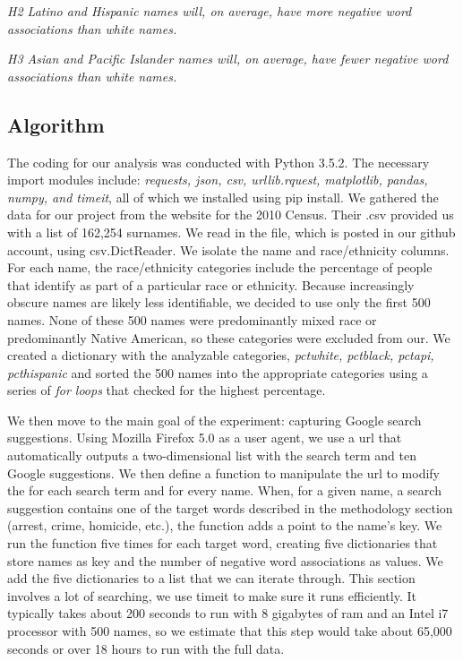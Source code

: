 \documentclass[sigconf]{acmart}
\begin{document}
{\em H2 Latino and Hispanic names will, on average, have more negative word associations than white names.} \\

\vspace{2mm}

{\em H3 Asian and Pacific Islander names will, on average, have fewer negative word associations than white names.}
\vspace{2mm}

\subsection{Algorithm}

The coding for our analysis was conducted with Python 3.5.2. The necessary import modules include: {\em requests, json, csv, urllib.rquest, matplotlib, pandas, numpy, and timeit}, all of which we installed using pip install. We gathered the data for our project from the website for the 2010 Census. Their .csv provided us with a list of 162,254 surnames. We read in the file, which is posted in our github account, using csv.DictReader. We isolate the name and race/ethnicity columns. For each name, the race/ethnicity categories include the percentage of people that identify as part of a particular race or ethnicity. Because increasingly obscure names are likely less identifiable, we decided to use only the first 500 names. None of these 500 names were predominantly mixed race or predominantly Native American, so these categories were excluded from our. We created a dictionary with the analyzable categories, {\em pctwhite, pctblack, pctapi, pcthispanic} and sorted the 500 names into the appropriate categories using a series of {\em for loops} that checked for the highest percentage. 

We then move to the main goal of the experiment: capturing Google search suggestions. Using Mozilla Firefox 5.0 as a user agent, we use a url that automatically outputs a two-dimensional list with the search term and ten Google suggestions. We then define a function to manipulate the url to modify the for each search term and for every name. When, for a given name, a search suggestion contains one of the target words described in the methodology section (arrest, crime, homicide, etc.), the function adds a point to the name's key. We run the function five times for each target word, creating five dictionaries that store names as key and the number of negative word associations as values. We add the five dictionaries to a list that we can iterate through. This section involves a lot of searching, we use timeit to make sure it runs efficiently. It typically takes about 200 seconds to run with 8 gigabytes of ram and an Intel i7 processor with 500 names, so we estimate that this step would take about 65,000 seconds or over 18 hours to run with the full data.
\end{document}
